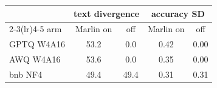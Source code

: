 \begin{tabular}{lcccc}
\toprule
& \multicolumn{2}{c}{text divergence} & \multicolumn{2}{c}{accuracy SD} \\
\cmidrule(lr){2-3}\cmidrule(lr){4-5}
arm & Marlin on & off & Marlin on & off \\
\midrule
GPTQ W4A16 & 53.2 & 0.0 & 0.42 & 0.00 \\
AWQ W4A16 & 53.6 & 0.0 & 0.35 & 0.00 \\
bnb NF4 & 49.4 & 49.4 & 0.31 & 0.31 \\
\bottomrule
\end{tabular}
